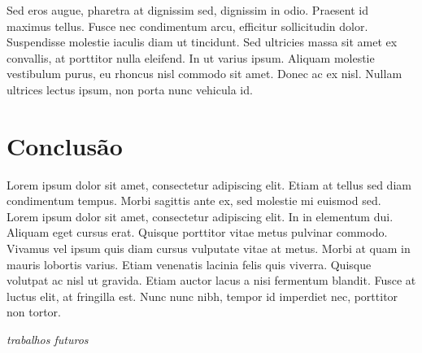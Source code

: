 \documentclass[12pt]{article}
\begin{document}
Sed eros augue, pharetra at dignissim sed, dignissim in odio. Praesent id maximus tellus. Fusce nec condimentum arcu, efficitur sollicitudin dolor. Suspendisse molestie iaculis diam ut tincidunt. Sed ultricies massa sit amet ex convallis, at porttitor nulla eleifend. In ut varius ipsum. Aliquam molestie vestibulum purus, eu rhoncus nisl commodo sit amet. Donec ac ex nisl. Nullam ultrices lectus ipsum, non porta nunc vehicula id. 

\section{Conclusão}

Lorem ipsum dolor sit amet, consectetur adipiscing elit. Etiam at tellus sed diam condimentum tempus. Morbi sagittis ante ex, sed molestie mi euismod sed. Lorem ipsum dolor sit amet, consectetur adipiscing elit. In in elementum dui. Aliquam eget cursus erat. Quisque porttitor vitae metus pulvinar commodo. Vivamus vel ipsum quis diam cursus vulputate vitae at metus. Morbi at quam in mauris lobortis varius. Etiam venenatis lacinia felis quis viverra. Quisque volutpat ac nisl ut gravida. Etiam auctor lacus a nisi fermentum blandit. Fusce at luctus elit, at fringilla est. Nunc nunc nibh, tempor id imperdiet nec, porttitor non tortor.

\textit{trabalhos futuros}



\end{document}
